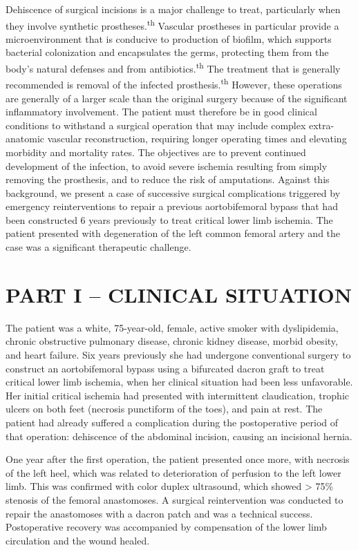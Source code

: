 \documentclass[numberinsection,times,10pt,spreadimages]{memoir}
\begin{document}
Dehiscence of surgical incisions is a major challenge to treat, particularly
when
they involve synthetic prostheses.\textsuperscript{th}
Vascular prostheses in particular provide a
microenvironment that is conducive to production of biofilm, which supports
bacterial colonization and encapsulates the germs, protecting them from the
body’s natural defenses and from antibiotics.\textsuperscript{th}
The treatment that is generally recommended is
removal of the infected prosthesis.\textsuperscript{th}
However, these operations are generally of a larger
scale than the original surgery because of the significant inflammatory
involvement. The patient must therefore be in good clinical conditions to
withstand a surgical operation that may include complex extra-anatomic vascular
reconstruction, requiring longer operating times and elevating morbidity and
mortality rates. The objectives are to prevent continued development of the
infection, to avoid severe ischemia resulting from simply removing the
prosthesis, and to reduce the risk of amputations. Against this background, we
present a case of successive surgical complications triggered by emergency
reinterventions to repair a previous aortobifemoral bypass that had been
constructed 6 years previously to treat critical lower limb ischemia. The
patient presented with degeneration of the left common femoral artery and the
case was a significant therapeutic challenge.

\section{PART I – CLINICAL SITUATION}

The patient was a white, 75-year-old, female, active smoker with dyslipidemia,
chronic obstructive pulmonary disease, chronic kidney disease, morbid obesity,
and heart failure. Six years previously she had undergone conventional surgery
to construct an aortobifemoral bypass using a bifurcated dacron graft to treat
critical lower limb ischemia, when her clinical situation had been less
unfavorable. Her initial critical ischemia had presented with intermittent
claudication, trophic ulcers on both feet (necrosis punctiform of the toes), and
pain at rest. The patient had already suffered a complication during the
postoperative period of that operation: dehiscence of the abdominal incision,
causing an incisional hernia.

One year after the first operation, the patient presented once more, with
necrosis of the left heel, which was related to deterioration of perfusion to
the left lower limb. This was confirmed with color duplex ultrasound, which
showed > 75\% stenosis of the femoral anastomoses. A surgical reintervention
was conducted to repair the anastomoses with a dacron patch and was a technical
success. Postoperative recovery was accompanied by compensation of the lower
limb circulation and the wound healed.
\end{document}
